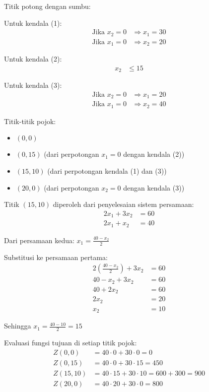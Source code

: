 \documentclass[12pt,a4paper]{article}
\begin{document}
\begin{enumerate}
    Titik potong dengan sumbu:
    
    Untuk kendala (1):
    \begin{align*}
    \text{Jika } x_2 = 0 &\Rightarrow x_1 = 30\\  
    \text{Jika } x_1 = 0 &\Rightarrow x_2 = 20
    \end{align*}
    
    Untuk kendala (2):
    \begin{align*}
    x_2 &\leq 15
    \end{align*}
    
    Untuk kendala (3):
    \begin{align*}
    \text{Jika } x_2 = 0 &\Rightarrow x_1 = 20\\  
    \text{Jika } x_1 = 0 &\Rightarrow x_2 = 40
    \end{align*}
    
    Titik-titik pojok:
    \begin{itemize}
        \item $(0,0)$
        \item $(0,15)$ (dari perpotongan $x_1 = 0$ dengan kendala (2))
        \item $(15,10)$ (dari perpotongan kendala (1) dan (3))
        \item $(20,0)$ (dari perpotongan $x_2 = 0$ dengan kendala (3))
    \end{itemize}
    
    Titik $(15,10)$ diperoleh dari penyelesaian sistem persamaan:
    \begin{align*}
    2x_1 + 3x_2 &= 60\\  
    2x_1 + x_2 &= 40
    \end{align*}
    
    Dari persamaan kedua: $x_1 = \frac{40 - x_2}{2}$
    
    Substitusi ke persamaan pertama:
    \begin{align*}
    2\left(\frac{40 - x_2}{2}\right) + 3x_2 &= 60\\  
    40 - x_2 + 3x_2 &= 60\\  
    40 + 2x_2 &= 60\\  
    2x_2 &= 20\\  
    x_2 &= 10
    \end{align*}
    
    Sehingga $x_1 = \frac{40 - 10}{2} = 15$
    
    Evaluasi fungsi tujuan di setiap titik pojok:
    \begin{align*}
    Z(0,0) &= 40 \cdot 0 + 30 \cdot 0 = 0\\  
    Z(0,15) &= 40 \cdot 0 + 30 \cdot 15 = 450\\  
    Z(15,10) &= 40 \cdot 15 + 30 \cdot 10 = 600 + 300 = 900\\  
    Z(20,0) &= 40 \cdot 20 + 30 \cdot 0 = 800
    \end{align*}
    

\end{enumerate}
\end{document}
